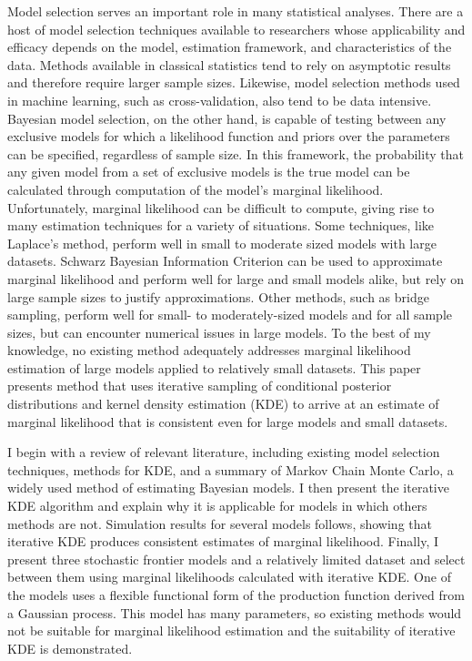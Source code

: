 \documentclass[twocolumn]{article}
\begin{document}
Model selection serves an important role in many statistical analyses. There are a host of model selection techniques available to researchers whose applicability and efficacy depends on the model, estimation framework, and characteristics of the data. Methods available in classical statistics tend to rely on asymptotic results and therefore require larger sample sizes. Likewise, model selection methods used in machine learning, such as cross-validation, also tend to be data intensive. Bayesian model selection, on the other hand, is capable of testing between any exclusive models for which a likelihood function and priors over the parameters can be specified, regardless of sample size. In this framework, the probability that any given model from a set of exclusive models is the true model can be calculated through computation of the model's marginal likelihood. Unfortunately, marginal likelihood can be difficult to compute, giving rise to many estimation techniques for a variety of situations. Some techniques, like Laplace's method, perform well in small to moderate sized models with large datasets. Schwarz Bayesian Information Criterion can be used to approximate marginal likelihood and perform well for large and small models alike, but rely on large sample sizes to justify approximations. Other methods, such as bridge sampling, perform well for small- to moderately-sized models and for all sample sizes, but can encounter numerical issues in large models. To the best of my knowledge, no existing method adequately addresses marginal likelihood estimation of large models applied to relatively small datasets. This paper presents method that uses iterative sampling of conditional posterior distributions and kernel density estimation (KDE) to arrive at an estimate of marginal likelihood that is consistent even for large models and small datasets.

I begin with a review of relevant literature, including existing model selection techniques, methods for KDE, and a summary of Markov Chain Monte Carlo, a widely used method of estimating Bayesian models. I then present the iterative KDE algorithm and explain why it is applicable for models in which others methods are not. Simulation results for several models follows, showing that iterative KDE produces consistent estimates of marginal likelihood. Finally, I present three stochastic frontier models and a relatively limited dataset and select between them using marginal likelihoods calculated with iterative KDE. One of the models uses a flexible functional form of the production function derived from a Gaussian process. This model has many parameters, so existing methods would not be suitable for marginal likelihood estimation and the suitability of iterative KDE is demonstrated.
\end{document}

